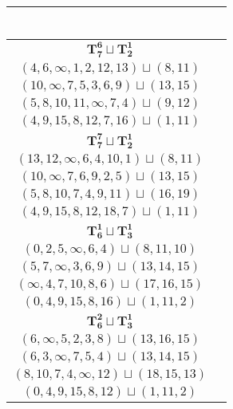 \documentclass{article}
\begin{document}
\begin{longtable}{|c|c|}
\begin{tabular}{c}
        \end{tabular} \\ 
        \hline
        $\mathbf{T_{7}^{6}} \sqcup \mathbf{T_{2}^{1}}$ & \begin{tabular}{c}
        $(5,4,2,0,1,3,6)\sqcup(9,\infty)$ \\ 
        $(4,6,\infty,1,2,12,13)\sqcup(8,11)$ \\ 
        $(10,\infty,7,5,3,6,9)\sqcup(13,15)$ \\ 
        $(5,8,10,11,\infty,7,4)\sqcup(9,12)$ \\ 
        $(4,9,15,8,12,7,16)\sqcup(1,11)$
        \end{tabular} \\ 
        \hline
        $\mathbf{T_{7}^{7}} \sqcup \mathbf{T_{2}^{1}}$ & \begin{tabular}{c}
        $(5,4,2,3,6,\infty,0)\sqcup(8,7)$ \\ 
        $(13,12,\infty,6,4,10,1)\sqcup(8,11)$ \\ 
        $(10,\infty,7,6,9,2,5)\sqcup(13,15)$ \\ 
        $(5,8,10,7,4,9,11)\sqcup(16,19)$ \\ 
        $(4,9,15,8,12,18,7)\sqcup(1,11)$
        \end{tabular} \\ 
        \hline
        $\mathbf{T_{6}^{1}} \sqcup \mathbf{T_{3}^{1}}$ & \begin{tabular}{c}
        $(3,5,4,2,\infty,1)\sqcup(13,12,15)$ \\ 
        $(0,2,5,\infty,6,4)\sqcup(8,11,10)$ \\ 
        $(5,7,\infty,3,6,9)\sqcup(13,14,15)$ \\ 
        $(\infty,4,7,10,8,6)\sqcup(17,16,15)$ \\ 
        $(0,4,9,15,8,16)\sqcup(1,11,2)$
        \end{tabular} \\ 
        \hline
        $\mathbf{T_{6}^{2}} \sqcup \mathbf{T_{3}^{1}}$ & \begin{tabular}{c}
        $(\infty,2,4,5,8,0)\sqcup(11,13,12)$ \\ 
        $(6,\infty,5,2,3,8)\sqcup(13,16,15)$ \\ 
        $(6,3,\infty,7,5,4)\sqcup(13,14,15)$ \\ 
        $(8,10,7,4,\infty,12)\sqcup(18,15,13)$ \\ 
        $(0,4,9,15,8,12)\sqcup(1,11,2)$
        \end{tabular} \\ 

\end{longtable}
\end{document}
